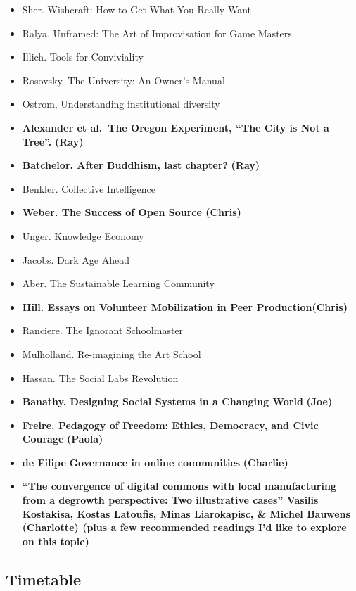 \begin{itemize}
\tightlist
\item
  Sher. Wishcraft: How to Get What You Really Want
\item
  Ralya. Unframed: The Art of Improvisation for Game Masters
\item
  Illich. Tools for Conviviality
\item
  Rosovsky. The University: An Owner's Manual
\item
  Ostrom, Understanding institutional diversity
\item
  \textbf{Alexander et al.~The Oregon Experiment, ``The City is Not a
  Tree''.} \textbf{(Ray)}
\item
  \textbf{Batchelor. After Buddhism, last chapter?} \textbf{(Ray)}
\item
  Benkler. Collective Intelligence
\item
  \textbf{Weber. The Success of Open Source (Chris)}
\item
  Unger. Knowledge Economy
\item
  Jacobs. Dark Age Ahead
\item
  Aber. The Sustainable Learning Community
\item
  \textbf{Hill. Essays on Volunteer Mobilization in Peer
  Production(Chris)}
\item
  Ranciere. The Ignorant Schoolmaster
\item
  Mulholland. Re-imagining the Art School
\item
  Hassan. The Social Labs Revolution
\item
  \textbf{Banathy. Designing Social Systems in a Changing World}
  \textbf{(Joe)}
\item
  \textbf{Freire. Pedagogy of Freedom: Ethics, Democracy, and Civic
  Courage} \textbf{(Paola)}
\item
  \textbf{de Filipe} \textbf{Governance in online communities}
  \textbf{(Charlie)}
\item
  \textbf{``The convergence of digital commons with local manufacturing
  from a degrowth perspective: Two illustrative cases'' Vasilis
  Kostakisa, Kostas Latoufis, Minas Liarokapisc, \& Michel Bauwens
  (Charlotte) (plus a few recommended readings I'd like to explore on
  this topic)}
\end{itemize}

\hypertarget{timetable}{%
\subsection{Timetable}\label{timetable}}

